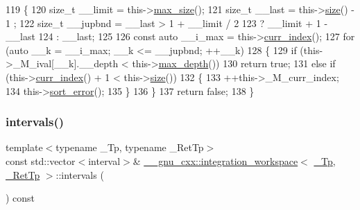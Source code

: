 \begin{DoxyCode}
119     \{
120       \textcolor{keywordtype}{size\_t} \_\_limit = this->\hyperlink{class____gnu__cxx_1_1integration__workspace_a5e175d0bd16b95c51fd39606ce65c6fb}{max\_size}();
121       \textcolor{keywordtype}{size\_t} \_\_last = this->\hyperlink{class____gnu__cxx_1_1integration__workspace_a3672c20ecc83962eca5bad7893437b6e}{size}() - 1 ;
122       \textcolor{keywordtype}{size\_t} \_\_jupbnd = \_\_last > 1 + \_\_limit / 2
123                       ? \_\_limit + 1 - \_\_last
124                       : \_\_last;
125 
126       \textcolor{keyword}{const} \textcolor{keyword}{auto} \_\_i\_max = this->\hyperlink{class____gnu__cxx_1_1integration__workspace_a51a384b1777615943add69f1895454f5}{curr\_index}();
127       \textcolor{keywordflow}{for} (\textcolor{keyword}{auto} \_\_k = \_\_i\_max; \_\_k <= \_\_jupbnd; ++\_\_k)
128         \{
129           \textcolor{keywordflow}{if} (this->\_M\_ival[\_\_k].\_\_depth < this->\hyperlink{class____gnu__cxx_1_1integration__workspace_a18115495f63c8a3fc27205cad0ba8869}{max\_depth}())
130             \textcolor{keywordflow}{return} \textcolor{keyword}{true};
131           \textcolor{keywordflow}{else} \textcolor{keywordflow}{if} (this->\hyperlink{class____gnu__cxx_1_1integration__workspace_a51a384b1777615943add69f1895454f5}{curr\_index}() + 1 < this->\hyperlink{class____gnu__cxx_1_1integration__workspace_a3672c20ecc83962eca5bad7893437b6e}{size}())
132             \{
133               ++this->\_M\_curr\_index;
134               this->\hyperlink{class____gnu__cxx_1_1integration__workspace_a01fe84e753d4654433b27bb35495c8aa}{sort\_error}();
135             \}
136         \}
137       \textcolor{keywordflow}{return} \textcolor{keyword}{false};
138     \}
\end{DoxyCode}
\mbox{\label{class____gnu__cxx_1_1integration__workspace_a9616ad00b222b6ec8c17ffcce4098877}} 
\subsubsection{\texorpdfstring{intervals()}{intervals()}}
{\footnotesize\ttfamily template$<$typename \+\_\+\+Tp, typename \+\_\+\+Ret\+Tp$>$ \\
const std\+::vector$<$interval$>$\& \hyperlink{class____gnu__cxx_1_1integration__workspace}{\+\_\+\+\_\+gnu\+\_\+cxx\+::integration\+\_\+workspace}$<$ \hyperlink{namespace____gnu__cxx_a3b19a9c800ca194374ef9172290f7d79}{\+\_\+\+Tp}, \hyperlink{namespace____gnu__cxx_a886e03ece3d53ff7fa6c098a40f93fa5}{\+\_\+\+Ret\+Tp} $>$\+::intervals (\begin{DoxyParamCaption}{ }\end{DoxyParamCaption}) const\hspace{0.3cm}{\ttfamily [inline]}}




